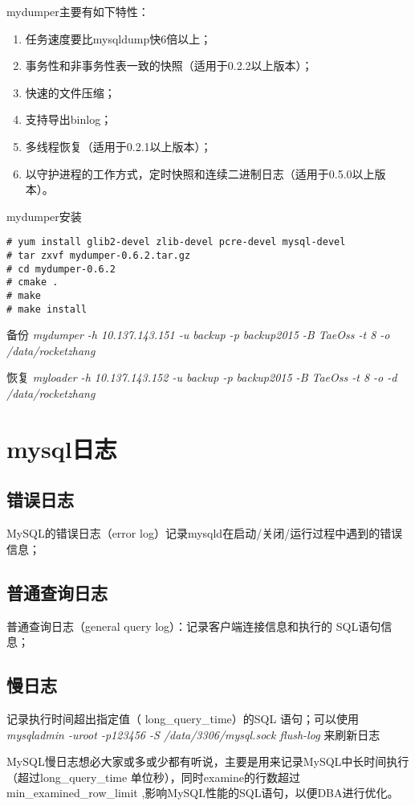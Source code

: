 mydumper主要有如下特性：
\begin{enumerate}
\item 任务速度要比mysqldump快6倍以上；
\item 事务性和非事务性表一致的快照（适用于0.2.2以上版本）；
\item 快速的文件压缩；
\item 支持导出binlog；
\item 多线程恢复（适用于0.2.1以上版本）；
\item 以守护进程的工作方式，定时快照和连续二进制日志（适用于0.5.0以上版本）。
 \end{enumerate}

mydumper安装
\begin{lstlisting}
# yum install glib2-devel zlib-devel pcre-devel mysql-devel
# tar zxvf mydumper-0.6.2.tar.gz
# cd mydumper-0.6.2
# cmake .
# make
# make install	
\end{lstlisting}

备份
\textit{ mydumper -h 10.137.143.151 -u backup -p backup2015 -B TaeOss -t 8 -o /data/rocketzhang}

恢复
\textit{ myloader -h 10.137.143.152 -u backup -p backup2015 -B TaeOss -t 8 -o -d /data/rocketzhang}
 
\section{mysql日志}

\subsection{错误日志}
MySQL的错误日志（error log）记录mysqld在启动/关闭/运行过程中遇到的错误信息；
\subsection{普通查询日志}
普通查询日志（general query log）：记录客户端连接信息和执行的 SQL语句信息； 

\subsection{慢日志}
记录执行时间超出指定值（ long_query_time）的SQL 语句；可以使用 \textit{mysqladmin -uroot -p123456 -S /data/3306/mysql.sock flush-log}  来刷新日志

MySQL慢日志想必大家或多或少都有听说，主要是用来记录MySQL中长时间执行（超过long_query_time 单位秒），同时examine的行数超过min_examined_row_limit ,影响MySQL性能的SQL语句，以便DBA进行优化。

